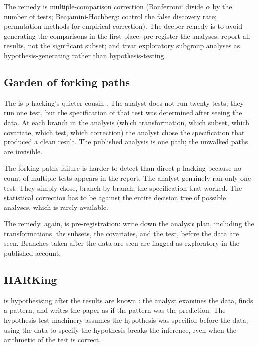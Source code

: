 The remedy is multiple-comparison correction (Bonferroni: divide
$\alpha$ by the number of tests; Benjamini-Hochberg: control the
false discovery rate; permutation methods for empirical correction).
The deeper remedy is to avoid generating the comparisons in the first
place: pre-register the analyses; report all results, not the
significant subset; and treat exploratory subgroup analyses as
hypothesis-generating rather than hypothesis-testing.

\subsection{Garden of forking paths}

The  is p-hacking's quieter cousin
\cite{method:gelman-loken-forking-paths}. The analyst does not run
twenty tests; they run one test, but the specification of that test
was determined after seeing the data. At
each branch in the analysis (which transformation, which subset,
which covariate, which test, which correction) the analyst chose the
specification that produced a clean result. The published analysis
is one path; the unwalked paths are invisible.

The forking-paths failure is harder to detect than direct p-hacking
because no count of multiple tests appears in the report. The
analyst genuinely ran only one test. They simply chose, branch by
branch, the specification that worked. The statistical correction
has to be against the entire decision tree of possible analyses,
which is rarely available.

The remedy, again, is pre-registration: write down the analysis
plan, including the transformations, the subsets, the covariates,
and the test, before the data are seen. Branches taken after the
data are seen are flagged as exploratory in the published account.

\subsection{HARKing}

 is hypothesising after the results are known
\cite{method:kerr-harking-1998}: the analyst examines the data,
finds a pattern, and writes the paper as if the pattern was the
prediction. The hypothesis-test machinery
assumes the hypothesis was specified before the data; using the data
to specify the hypothesis breaks the inference, even when the
arithmetic of the test is correct.

